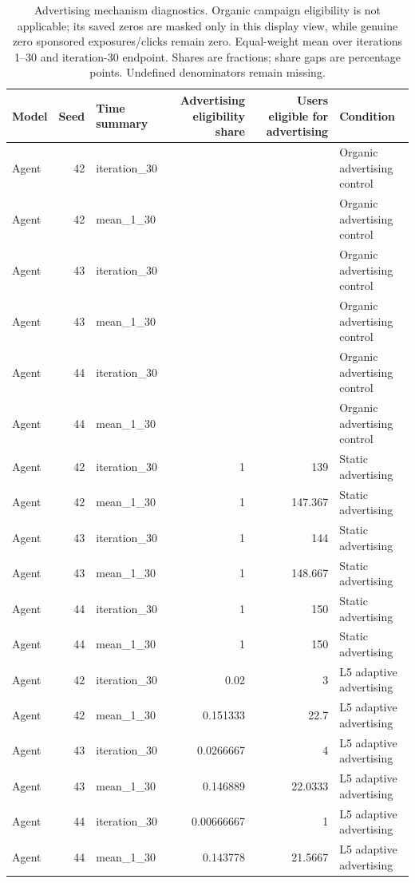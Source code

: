\begin{table}[htbp!]
\centering
\small
\setlength{\tabcolsep}{3pt}
\renewcommand{\arraystretch}{1.1}
\begin{tabular}{lrlrrl}
\hline
Model & Seed & Time summary & Advertising eligibility share & Users eligible for advertising & Condition \\
\hline
Agent & 42 & iteration\_30 & \textemdash{} & \textemdash{} & Organic advertising control \\
Agent & 42 & mean\_1\_30 & \textemdash{} & \textemdash{} & Organic advertising control \\
Agent & 43 & iteration\_30 & \textemdash{} & \textemdash{} & Organic advertising control \\
Agent & 43 & mean\_1\_30 & \textemdash{} & \textemdash{} & Organic advertising control \\
Agent & 44 & iteration\_30 & \textemdash{} & \textemdash{} & Organic advertising control \\
Agent & 44 & mean\_1\_30 & \textemdash{} & \textemdash{} & Organic advertising control \\
Agent & 42 & iteration\_30 & 1 & 139 & Static advertising \\
Agent & 42 & mean\_1\_30 & 1 & 147.367 & Static advertising \\
Agent & 43 & iteration\_30 & 1 & 144 & Static advertising \\
Agent & 43 & mean\_1\_30 & 1 & 148.667 & Static advertising \\
Agent & 44 & iteration\_30 & 1 & 150 & Static advertising \\
Agent & 44 & mean\_1\_30 & 1 & 150 & Static advertising \\
Agent & 42 & iteration\_30 & 0.02 & 3 & L5 adaptive advertising \\
Agent & 42 & mean\_1\_30 & 0.151333 & 22.7 & L5 adaptive advertising \\
Agent & 43 & iteration\_30 & 0.0266667 & 4 & L5 adaptive advertising \\
Agent & 43 & mean\_1\_30 & 0.146889 & 22.0333 & L5 adaptive advertising \\
Agent & 44 & iteration\_30 & 0.00666667 & 1 & L5 adaptive advertising \\
Agent & 44 & mean\_1\_30 & 0.143778 & 21.5667 & L5 adaptive advertising \\
\hline
\end{tabular}
\caption{Advertising mechanism diagnostics. Organic campaign eligibility is not applicable; its saved zeros are masked only in this display view, while genuine zero sponsored exposures/clicks remain zero. Equal-weight mean over iterations 1--30 and iteration-30 endpoint. Shares are fractions; share gaps are percentage points. Undefined denominators remain missing.}
\label{chap:results:tab:rq1_advertising_eligibility}
\end{table}
